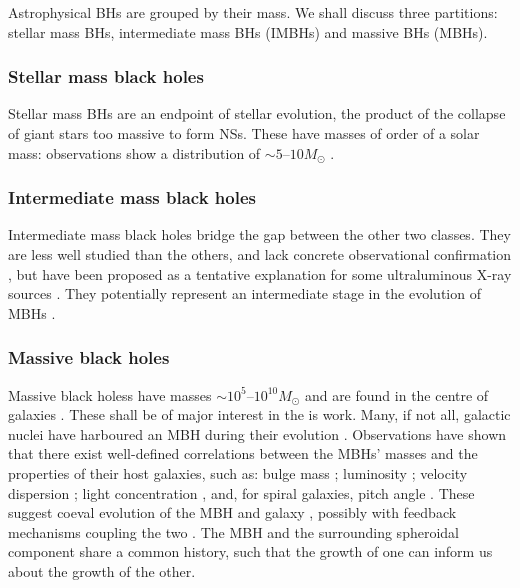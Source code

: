 Astrophysical BHs are grouped by their mass. We shall discuss three partitions: stellar mass BHs, intermediate mass BHs (IMBHs) and massive BHs (MBHs). 

\subsubsection{Stellar mass black holes}

Stellar mass BHs are an endpoint of stellar evolution, the product of the collapse of giant stars too massive to form NSs. These have masses of order of a solar mass: observations show a distribution of $\sim5$--$10M_\odot$ \citep{Ozel2010,Farr2010}. 

\subsubsection{Intermediate mass black holes}

Intermediate mass black holes bridge the gap between the other two classes. They are less well studied than the others, and lack concrete observational confirmation \citep{Miller2009a}, but have been proposed as a tentative explanation for some ultraluminous X-ray sources \citep{Feng2011}. They potentially represent an intermediate stage in the evolution of MBHs \citep{Graham2013}.

\subsubsection{Massive black holes}

Massive black holess have masses $\sim10^5$--$10^{10} M_\odot$ and are found in the centre of galaxies \citep{Lynden-Bell1969,Ferrarese2005}. These shall be of major interest in the is work. Many, if not all, galactic nuclei have harboured an MBH during their evolution \citep{Lynden-Bell1971, Soltan1982, Rees1984}. Observations have shown that there exist well-defined correlations between the MBHs' masses and the properties of their host galaxies, such as: bulge mass \citep{Kormendy1995,Haring2004,Graham2012a}; luminosity \citep{Magorrian1998,Marconi2003,Graham2013}; velocity dispersion \citep{Ferrarese2000,Gebhardt2000,Tremaine2002,Graham2011}; light concentration \citep{Graham2001}, and, for spiral galaxies, pitch angle \citep{Seigar2008,Berrier2013}. These suggest coeval evolution of the MBH and galaxy \citep{Peng2007, Jahnke2011}, possibly with feedback mechanisms coupling the two \citep{Haiman2004, Volonteri2009}. The MBH and the surrounding spheroidal component share a common history, such that the growth of one can inform us about the growth of the other.

